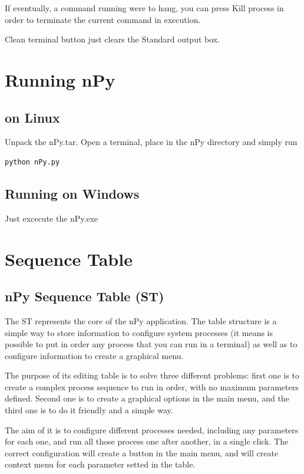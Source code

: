 \documentclass[a4paper,10pt]{article}
\begin{document}
If eventually, a command running were to hang, you can press Kill process in order to terminate the current command in execution.

Clean terminal button just clears the Standard output box.

\section{Running nPy}

\subsection{on Linux}

Unpack the nPy.tar. Open a terminal, place in the nPy directory and simply run
\begin{verbatim}
python nPy.py 
\end{verbatim}

\subsection{Running on Windows}

Just excecute the nPy.exe

\section{Sequence Table}

\subsection{nPy Sequence Table (ST)}

The ST represents the core of the nPy application. The table structure is a simple way to store information to configure system processes (it means is possible to put in order any process that you can run in a terminal) as well as to configure information to create a graphical menu.

The purpose of its editing table is to solve three different problems: first one is to create a complex process sequence to run in order, with no maximum parameters defined. Second one is to create a graphical options in the main menu, and the third one is to do it friendly and a simple way.

The aim of it is to configure different processes needed, including any parameters for each one, and run all those process one after another, in a single click. The correct configuration will create a button in the main menu, and will create context menu for each parameter setted in the table.
\end{document}
